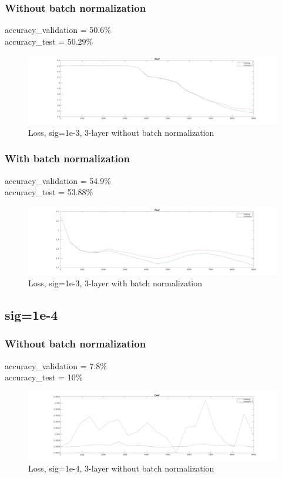 \subsubsection{Without batch normalization}
accuracy\_validation = 50.6\%\\
accuracy\_test = 50.29\%
\begin{figure}[ht]
    \includegraphics[width=\textwidth]{../code/result_pics/cost_lambda=0.00500_ns=2250_cycles=2_k=3_sig=0.00100_bn=0.png}
    \caption{Loss, sig=1e-3, 3-layer without batch normalization}
\end{figure}

\subsubsection{With batch normalization}
accuracy\_validation = 54.9\%\\
accuracy\_test = 53.88\%
\begin{figure}[ht]
    \includegraphics[width=\textwidth]{../code/result_pics/cost_lambda=0.00500_ns=2250_cycles=2_k=3_sig=0.00100_bn=1.png}
    \caption{Loss, sig=1e-3, 3-layer with batch normalization}
\end{figure}
\clearpage

\subsection{sig=1e-4}
\subsubsection{Without batch normalization}
accuracy\_validation = 7.8\%\\
accuracy\_test = 10\%
\begin{figure}[ht]
    \includegraphics[width=\textwidth]{../code/result_pics/cost_lambda=0.00500_ns=2250_cycles=2_k=3_sig=0.00010_bn=0.png}
    \caption{Loss, sig=1e-4, 3-layer without batch normalization}
\end{figure}

